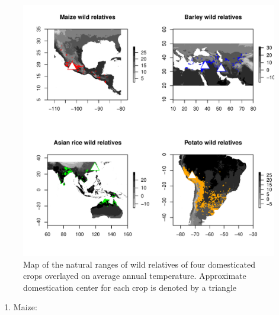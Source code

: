 \documentclass[11pt]{article}
\begin{document}
{\begin{figure}[h]
	\centering
	\includegraphics[width=15cm]{temperature_plot_degC.pdf}
	\caption{Map of the natural ranges of wild relatives of four domesticated crops overlayed on average annual temperature. Approximate domestication center for each crop is denoted by a triangle}
	\label{fig:map}
\end{figure}


\begin{enumerate}
\item{Maize:}


\end{enumerate}}
\end{document}
